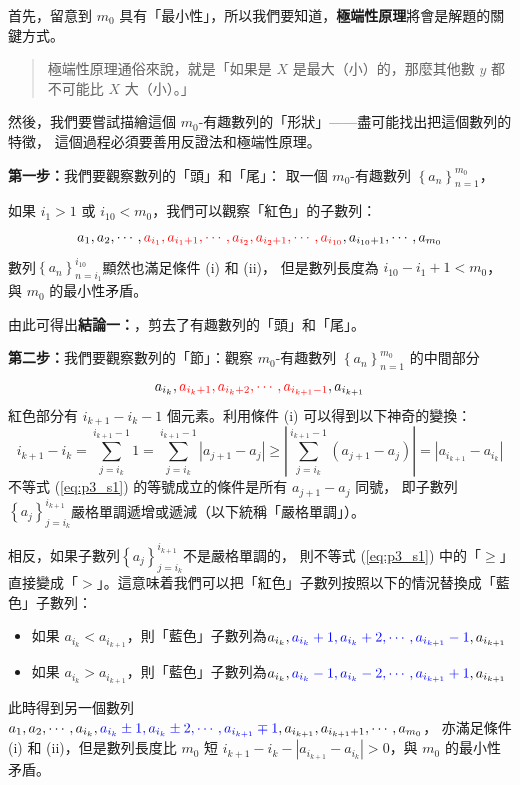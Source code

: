 \setcounter{equation}{0}
首先，留意到 $m_0$ 具有「最小性」，所以我們要知道，\textbf{極端性原理}將會是解題的關鍵方式。
\begin{quotation}
  極端性原理通俗來說，就是「如果是 $X$ 是最大（小）的，那麼其他數 $y$ 都不可能比 $X$ 大（小）。」
\end{quotation}
然後，我們要嘗試描繪這個 $m_0$-有趣數列的「形狀」——盡可能找出把這個數列的特徵，
這個過程必須要善用反證法和極端性原理。

\textbf{第一步：}我們要觀察數列的「頭」和「尾」：
取一個 $m_0$-有趣數列 $\left\{a_n\right\}_{n=1}^{m_0}$，

如果 $i_1>1$ 或 $i_{10}<m_0$，我們可以觀察「紅色」的子數列： 
\begin{equation*}
  a_1,a_2,\cdots,\color{red}{a_{i_1},a_{i_1+1},\cdots,a_{i_2},a_{i_2+1},\cdots,a_{i_{10}}}\color{black}{,a_{i_{10}+1},\cdots,a_{m_0}}
\end{equation*}
數列$\left\{a_n\right\}_{n=i_1}^{i_{10}}$顯然也滿足條件 (i) 和 (ii)，
但是數列長度為 $i_{10}-i_1+1<m_0$，與 $m_0$ 的最小性矛盾。

由此可得出\textbf{結論一：}，剪去了有趣數列的「頭」和「尾」。

\textbf{第二步：}我們要觀察數列的「節」：觀察 $m_0$-有趣數列 $\left\{a_n\right\}_{n=1}^{m_0}$ 的中間部分
$$
  a_{i_k},\color{red}{a_{i_k+1},a_{i_k+2},\cdots,a_{i_{k+1}-1}}\color{black}{,a_{i_{k+1}}}
$$
紅色部分有 $i_{k+1}-i_k-1$ 個元素。利用條件 (i) 可以得到以下神奇的變換：
\begin{equation}
  i_{k+1}-i_k=\sum_{j=i_k}^{i_{k+1}-1}{1}=\sum_{j=i_k}^{i_{k+1}-1}{\left|a_{j+1}-a_j\right|}\geq\left|\sum_{j=i_k}^{i_{k+1}-1}{\left(a_{j+1}-a_j\right)}\right|=|a_{i_{k+1}}-a_{i_k}|\label{eq:p3_s1}
\end{equation}
不等式 (\ref{eq:p3_s1}) 的等號成立的條件是所有 $a_{j+1}-a_j$ 同號，
即子數列$\left\{a_j\right\}_{j=i_k}^{i_{k+1}}$嚴格單調遞增或遞減（以下統稱「嚴格單調」）。

相反，如果子數列$\left\{a_j\right\}_{j=i_k}^{i_{k+1}}$不是嚴格單調的，
則不等式 (\ref{eq:p3_s1}) 中的「$\geq$」直接變成「$>$」。這意味着我們可以把「紅色」子數列按照以下的情況替換成「藍色」子數列：
\begin{itemize}
  \item 如果 $a_{i_k}<a_{i_{k+1}}$，則「藍色」子數列為$a_{i_k},\color{blue}{a_{i_k}+1,a_{i_k}+2,\cdots,a_{i_{k+1}}-1}\color{black}{,a_{i_{k+1}}}$
  \item 如果 $a_{i_k}>a_{i_{k+1}}$，則「藍色」子數列為$a_{i_k},\color{blue}{a_{i_k}-1,a_{i_k}-2,\cdots,a_{i_{k+1}}+1}\color{black}{,a_{i_{k+1}}}$
\end{itemize}
此時得到另一個數列 $a_1,a_2,\cdots,a_{i_k},\color{blue}{a_{i_k}\pm1,a_{i_k}\pm2,\cdots,a_{i_{k+1}}\mp1}\color{black}{,a_{i_{k+1}},a_{i_{k+1}+1},\cdots,a_{m_0}}$，
亦滿足條件 (i) 和 (ii)，但是數列長度比 $m_0$ 短 $i_{k+1}-i_k-|a_{i_{k+1}}-a_{i_k}|>0$，與 $m_0$ 的最小性矛盾。

